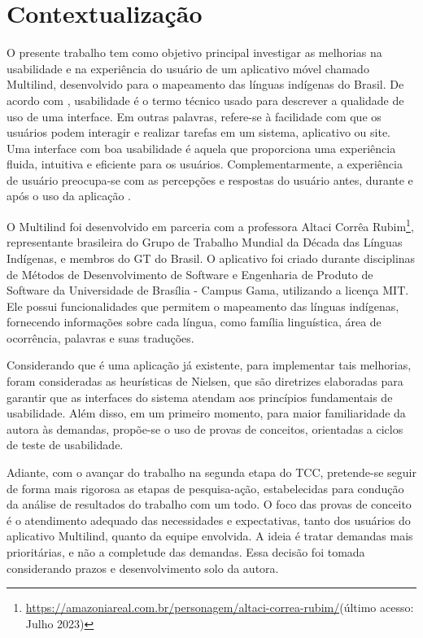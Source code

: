 \section{Contextualização}
\label{sec:Contextualizacao}
O presente trabalho tem como objetivo principal investigar as melhorias na usabilidade e na experiência do usuário de um aplicativo móvel chamado Multilind, desenvolvido para o mapeamento das línguas indígenas do Brasil. 
De acordo com , usabilidade é o termo técnico usado para descrever a qualidade de uso de uma interface. Em outras palavras, refere-se à facilidade com que os usuários podem interagir e realizar 
tarefas em um sistema, aplicativo ou site. Uma interface com boa usabilidade é aquela que proporciona uma experiência fluida, intuitiva e eficiente para os usuários. Complementarmente, a experiência de usuário preocupa-se 
com as percepções e respostas do usuário antes, durante e após o uso da aplicação \cite{iso9241210}.

O Multilind foi desenvolvido em parceria com a professora Altaci Corrêa Rubim\footnote{\url{https://amazoniareal.com.br/personagem/altaci-correa-rubim/}(último acesso: Julho 2023)}, representante brasileira do Grupo de Trabalho Mundial da Década das Línguas Indígenas, 
e membros do GT do Brasil. O aplicativo foi criado durante disciplinas de Métodos de Desenvolvimento de Software e Engenharia de Produto de Software da Universidade de Brasília - Campus Gama, utilizando a licença MIT. Ele possui funcionalidades que permitem o mapeamento 
das línguas indígenas, fornecendo informações sobre cada língua, como família linguística, área de ocorrência, palavras e suas traduções.

Considerando que é uma aplicação já existente, para implementar tais melhorias, foram consideradas as heurísticas de Nielsen, que são diretrizes elaboradas para garantir que as interfaces do sistema atendam aos princípios fundamentais de usabilidade. Além disso, em um 
primeiro momento, para maior familiaridade da autora às demandas, propõe-se o uso de provas de conceitos, orientadas a ciclos de teste de usabilidade. 

Adiante, com o avançar do trabalho na segunda etapa do TCC, pretende-se seguir de forma mais rigorosa as etapas de 
pesquisa-ação, estabelecidas para condução da análise de resultados do trabalho com um todo. O foco das provas de conceito é o atendimento adequado das necessidades e expectativas, tanto dos usuários do aplicativo Multilind, quanto da equipe envolvida. A ideia é tratar 
demandas mais prioritárias, e não a completude das demandas. Essa decisão foi tomada considerando prazos e desenvolvimento solo da autora.

